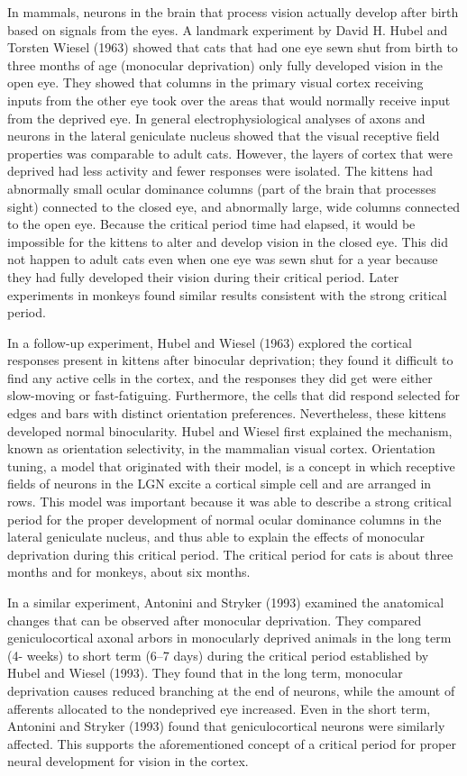 In mammals, neurons in the brain that process vision actually develop after birth based on signals from the eyes. A landmark experiment by David H. Hubel and Torsten Wiesel (1963) showed that cats that had one eye sewn shut from birth to three months of age (monocular deprivation) only fully developed vision in the open eye. They showed that columns in the primary visual cortex receiving inputs from the other eye took over the areas that would normally receive input from the deprived eye. In general electrophysiological analyses of axons and neurons in the lateral geniculate nucleus showed that the visual receptive field properties was comparable to adult cats. However, the layers of cortex that were deprived had less activity and fewer responses were isolated. The kittens had abnormally small ocular dominance columns (part of the brain that processes sight) connected to the closed eye, and abnormally large, wide columns connected to the open eye. Because the critical period time had elapsed, it would be impossible for the kittens to alter and develop vision in the closed eye. This did not happen to adult cats even when one eye was sewn shut for a year because they had fully developed their vision during their critical period. Later experiments in monkeys found similar results consistent with the strong critical period.

In a follow-up experiment, Hubel and Wiesel (1963) explored the cortical responses present in kittens after binocular deprivation; they found it difficult to find any active cells in the cortex, and the responses they did get were either slow-moving or fast-fatiguing. Furthermore, the cells that did respond selected for edges and bars with distinct orientation preferences. Nevertheless, these kittens developed normal binocularity. Hubel and Wiesel first explained the mechanism, known as orientation selectivity, in the mammalian visual cortex. Orientation tuning, a model that originated with their model, is a concept in which receptive fields of neurons in the LGN excite a cortical simple cell and are arranged in rows. This model was important because it was able to describe a strong critical period for the proper development of normal ocular dominance columns in the lateral geniculate nucleus, and thus able to explain the effects of monocular deprivation during this critical period. The critical period for cats is about three months and for monkeys, about six months.

In a similar experiment, Antonini and Stryker (1993) examined the anatomical changes that can be observed after monocular deprivation. They compared geniculocortical axonal arbors in monocularly deprived animals in the long term (4- weeks) to short term (6--7 days) during the critical period established by Hubel and Wiesel (1993). They found that in the long term, monocular deprivation causes reduced branching at the end of neurons, while the amount of afferents allocated to the nondeprived eye increased. Even in the short term, Antonini and Stryker (1993) found that geniculocortical neurons were similarly affected. This supports the aforementioned concept of a critical period for proper neural development for vision in the cortex.

